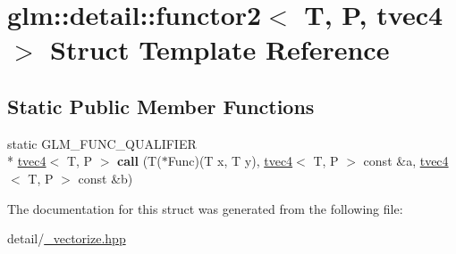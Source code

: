 \hypertarget{structglm_1_1detail_1_1functor2_3_01T_00_01P_00_01tvec4_01_4}{\section{glm\-:\-:detail\-:\-:functor2$<$ T, P, tvec4 $>$ Struct Template Reference}
\label{structglm_1_1detail_1_1functor2_3_01T_00_01P_00_01tvec4_01_4}
}
\subsection*{Static Public Member Functions}
\begin{DoxyCompactItemize}
\item 
\hypertarget{structglm_1_1detail_1_1functor2_3_01T_00_01P_00_01tvec4_01_4_a27fb8a00559c0caa02b7e5892301922f}{static G\-L\-M\-\_\-\-F\-U\-N\-C\-\_\-\-Q\-U\-A\-L\-I\-F\-I\-E\-R \\*
\hyperlink{structglm_1_1tvec4}{tvec4}$<$ T, P $>$ {\bfseries call} (T($\ast$Func)(T x, T y), \hyperlink{structglm_1_1tvec4}{tvec4}$<$ T, P $>$ const \&a, \hyperlink{structglm_1_1tvec4}{tvec4}$<$ T, P $>$ const \&b)}\label{structglm_1_1detail_1_1functor2_3_01T_00_01P_00_01tvec4_01_4_a27fb8a00559c0caa02b7e5892301922f}

\end{DoxyCompactItemize}


The documentation for this struct was generated from the following file\-:\begin{DoxyCompactItemize}
\item 
detail/\hyperlink{__vectorize_8hpp}{\-\_\-vectorize.\-hpp}\end{DoxyCompactItemize}
